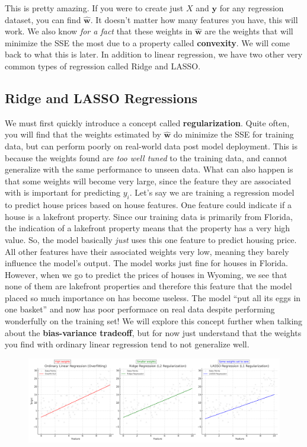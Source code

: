     This is pretty amazing. If you were to create just $X$ and $\textbf{y}$ for any regression dataset, you can find $\hat{\textbf{w}}$. It doesn't matter how many features you have, this will work. We also know \textit{for a fact} that these weights in $\hat{\textbf{w}}$ are the weights that will minimize the SSE the most due to a property called \textbf{convexity}. We will come back to what this is later. In addition to linear regression, we have two other very common types of regression called Ridge and LASSO.

\subsection{Ridge and LASSO Regressions}
    \large We must first quickly introduce a concept called \textbf{regularization}. Quite often, you will find that the weights estimated by $\hat{\textbf{w}}$ do minimize the SSE for training data, but can perform poorly on real-world data post model deployment. This is because the weights found are \textit{too well tuned} to the training data, and cannot generalize with the same performance to unseen data. What can also happen is that some weights will become very large, since the feature they are associated with is important for predicting $y_i$. Let's say we are training a regression model to predict house prices based on house features. One feature could indicate if a house is a lakefront property. Since our training data is primarily from Florida, the indication of a lakefront property means that the property has a very high value. So, the model basically \textit{just} uses this one feature to predict housing price. All other features have their associated weights very low, meaning they barely influence the model's output. The model works just fine for houses in Florida. However, when we go to predict the prices of houses in Wyoming, we see that none of them are lakefront properties and therefore this feature that the model placed so much importance on has become useless. The model ``put all its eggs in one basket'' and now has poor performace on real data despite performing wonderfully on the training set! We will explore this concept further when talking about the \textbf{bias-variance tradeoff}, but for now just understand that the weights you find with ordinary linear regression tend to not generalize well.

    \begin{figure}[H]
        \centering
        \includegraphics[width=0.85\linewidth]{ml/regression_comparison.png}
        \label{fig:regression_comparison}
    \end{figure}
    
